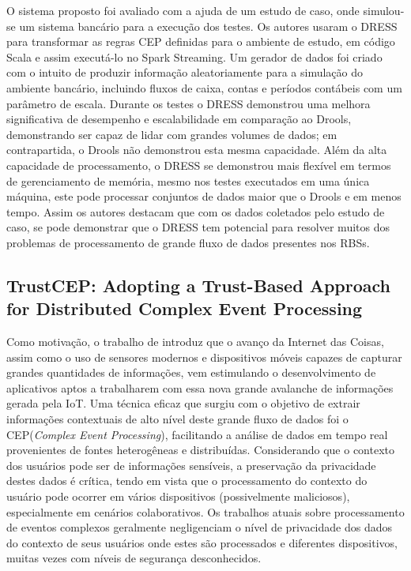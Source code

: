 \documentclass[ti,table]{texufpel} %
\begin{document}
    O sistema proposto foi avaliado com a ajuda de um estudo de caso, onde simulou-se um sistema bancário para a execução dos testes. Os autores usaram o DRESS para transformar as regras CEP definidas para o ambiente de estudo, em código Scala e assim executá-lo no Spark Streaming. Um gerador de dados foi criado com o intuito de produzir informação aleatoriamente para a simulação do ambiente bancário, incluindo fluxos de caixa, contas e períodos contábeis com um parâmetro de escala. Durante os testes o DRESS demonstrou uma melhora significativa de desempenho e escalabilidade em comparação ao Drools, demonstrando ser capaz de lidar com grandes volumes de dados; em contrapartida, o Drools não demonstrou esta mesma capacidade. Além da alta capacidade de processamento, o DRESS se demonstrou mais flexível em termos de gerenciamento de memória, mesmo nos testes executados em uma única máquina, este pode processar conjuntos de dados maior que o Drools e em menos tempo. Assim os autores destacam que com os dados coletados pelo estudo de caso, se pode demonstrar que o DRESS tem potencial para resolver muitos dos problemas de processamento de grande fluxo de dados presentes nos RBSs. 

     

  

  

\subsection{TrustCEP: Adopting a Trust-Based Approach for Distributed Complex Event Processing} 

  

    Como motivação, o trabalho de \cite{art6dwarakanath2017trustcep} introduz que o avanço da Internet das Coisas, assim como o uso de sensores modernos e dispositivos móveis capazes de capturar grandes quantidades de informações, vem estimulando o desenvolvimento de aplicativos aptos a trabalharem com essa nova grande avalanche de informações gerada pela IoT. Uma técnica eficaz que surgiu com o objetivo de extrair informações contextuais de alto nível deste grande fluxo de dados foi o CEP(\textit{Complex Event Processing}), facilitando a análise de dados em tempo real provenientes de fontes heterogêneas e distribuídas. Considerando que o contexto dos usuários pode ser de informações sensíveis, a preservação da privacidade destes dados é crítica, tendo em vista que o processamento do contexto do usuário pode ocorrer em vários dispositivos (possivelmente maliciosos), especialmente em cenários colaborativos. Os trabalhos atuais sobre processamento de eventos complexos geralmente negligenciam o nível de privacidade dos dados do contexto de seus usuários onde estes são processados e diferentes dispositivos, muitas vezes com níveis de segurança desconhecidos.  
\end{document}
